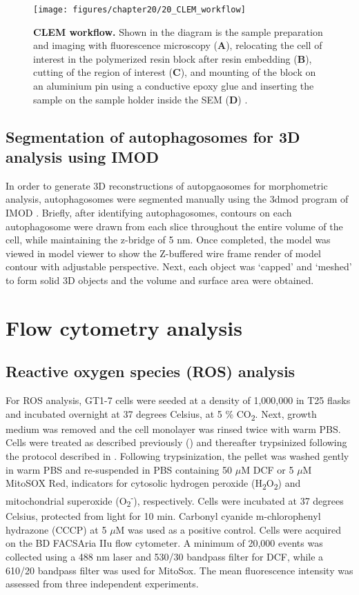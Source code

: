 \begin{figure}[H]
  \texttt{[image: figures/chapter20/20\_CLEM\_workflow]}
  \caption[CLEM workflow]{\textbf{CLEM workflow.} Shown in the diagram is the sample preparation and imaging with fluorescence microscopy (\textbf{A}), relocating the cell of interest in the polymerized resin block after resin embedding (\textbf{B}), cutting of the region of interest (\textbf{C}), and mounting of the block on an aluminium pin using a conductive epoxy glue and inserting the sample on the sample holder inside the SEM (\textbf{D}) \citep{Russell2017}.}
  \label{fig:20_CLEM_workflow}
\end{figure}

\subsection{Segmentation of autophagosomes for 3D analysis using IMOD}
In order to generate 3D reconstructions of autopgaosomes for morphometric analysis, autophagosomes were segmented manually using the 3dmod program of IMOD \citep{Kremer1996}. Briefly, after identifying autophagosomes, contours on each autophagosome were drawn  from each slice throughout the entire volume of the cell, while maintaining the z-bridge of 5 nm. Once completed, the model was viewed in model viewer to show the Z-buffered wire frame render of model contour with adjustable perspective. Next, each object was ‘capped’ and ‘meshed’ to form solid 3D objects and the volume and surface area were obtained.

\section{Flow cytometry analysis}
\subsection{Reactive oxygen species (ROS) analysis}
For ROS analysis,  GT1-7 cells were seeded at a density of 1,000,000 in T25 flasks and incubated overnight at 37 degrees Celsius, at 5 \% CO\textsubscript{2}. Next, growth medium was removed and the cell monolayer was rinsed twice with warm PBS. Cells were treated as described previously () and thereafter trypsinized following the protocol described in . Following trypsinization, the pellet was washed gently in warm PBS and re-suspended in PBS containing 50 $\mu$M DCF or 5 $\mu$M MitoSOX Red, indicators for cytosolic hydrogen peroxide (H\textsubscript{2}O\textsubscript{2}) and mitochondrial superoxide (O\textsubscript{2}\textsuperscript{-}), respectively. Cells were incubated at 37 degrees Celsius, protected from light for 10 min. Carbonyl cyanide m-chlorophenyl hydrazone (CCCP) at 5 $\mu$M was used as a positive control. Cells were acquired on the BD FACSAria IIu flow cytometer. A minimum of 20,000 events was collected using a 488 nm laser and 530/30 bandpass filter for DCF, while a 610/20 bandpass filter was used for MitoSox. The mean fluorescence intensity was assessed from three independent experiments. 

